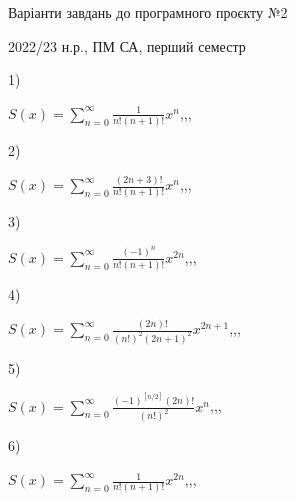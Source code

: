 \documentclass[11pt, ukrainian]{article}
\begin{document}
{\Large \center  Варіанти завдань до програмного проєкту №2\par 2022/23 н.р., ПМ СА, перший семестр\par \bigskip}
1) \space 
{%
{$S(x)=\sum\limits_{n=0}^{\infty}{\frac{1}{n!(n+1)!}}{x^{{n}}}$},,, \par \smallskip  
}
\par
\vspace{0.9cm}
2) \space 
{%
{$S(x)=\sum\limits_{n=0}^{\infty}{\frac{(2n+3)!}{n!(n+1)!}}{x^{n}}$},,, \par \smallskip  
}
\par
\vspace{0.9cm}
3) \space 
{%
{$S(x)=\sum\limits_{n=0}^{\infty}{\frac{(-1)^n}{n!(n+1)!}}{x^{{2n}}}$},,, \par \smallskip  
}
\par
\vspace{0.9cm}
4) \space 
{%
{$S(x)=\sum\limits_{n=0}^{\infty}{\frac{(2n)!}{{(n!)^2}{(2n+1)^2}}}{x^{{2n+1}}}$},,, \par \smallskip  
}
\par
\vspace{0.9cm}
5) \space 
{%
{$S(x)=\sum\limits_{n=0}^{\infty}{\frac{{(-1)^{[n/2]}}(2n)!}{(n!)^2}}{x^{n}}$},,, \par \smallskip  
}
\par
\vspace{0.9cm}
6) \space 
{%
{$S(x)=\sum\limits_{n=0}^{\infty}{\frac{1}{n!(n+1)!}}{x^{{2n}}}$},,, \par \smallskip  
}
\end{document}
